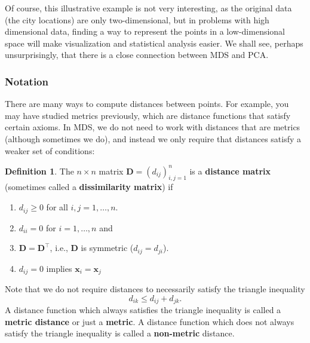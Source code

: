 \documentclass[]{book}
\providecommand{\tightlist}{%
  \setlength{\itemsep}{0pt}\setlength{\parskip}{0pt}}
\theoremstyle{definition}
\newtheorem{definition}{Definition}[chapter]
\theoremstyle{definition}
\theoremstyle{definition}
\theoremstyle{remark}
\begin{document}
Of course, this illustrative example is not very interesting, as the original data (the city locations) are only two-dimensional, but in problems with high dimensional data, finding a way to
represent the points in a low-dimensional space will make visualization and statistical analysis easier. We shall see, perhaps unsurprisingly, that there is a close connection between MDS and PCA.

\hypertarget{notation-2}{%
\subsubsection*{Notation}\label{notation-2}}

There are many ways to compute distances between points. For example, you may have studied metrics previously, which are distance functions that satisfy certain axioms. In MDS, we do not need to work with distances that are metrics (although sometimes we do), and instead we only require that distances satisfy a weaker set of conditions:

\begin{definition}
\protect\hypertarget{def:distanceD}{}{\label{def:distanceD} }The \(n \times n\) matrix \(\mathbf D=(d_{ij})_{i,j=1}^n\) is a \textbf{distance matrix} (sometimes called a \textbf{dissimilarity matrix}) if

\begin{enumerate}
\def\labelenumi{\arabic{enumi}.}
\tightlist
\item
  \(d_{ij}\geq 0\) for all \(i, j=1,\ldots,n\).
\item
  \(d_{ii}=0\) for \(i=1,\ldots, n\) and
\item
  \(\mathbf D=\mathbf D^\top\), i.e., \(\mathbf D\) is symmetric (\(d_{ij}=d_{ji}\)).
\item
  \(d_{ij}=0\) implies \(\mathbf x_i=\mathbf x_j\)
\end{enumerate}
\end{definition}

Note that we do not require distances to necessarily satisfy the triangle inequality
\begin{equation}
d_{ik} \leq d_{ij}+d_{jk}.
\label{eq:triangle}
\end{equation}
A distance function which always satisfies the triangle inequality is called a \textbf{metric distance}
or just a \textbf{metric}. A distance function which does not always satisfy the triangle inequality is called a
\textbf{non-metric} distance.
\end{document}
